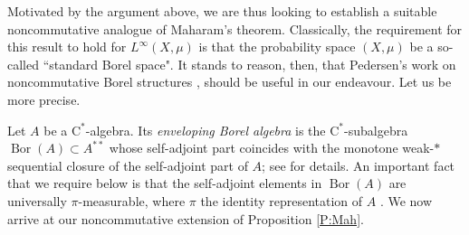 \documentclass[10pt]{amsart}
\newcommand{\rC}{\mathrm{C}}
\newcommand{\Bor}{\operatorname{Bor}}
\theoremstyle{definition}
\begin{document}
Motivated by the argument above, we are thus looking to establish a suitable noncommutative analogue of Maharam's theorem. Classically, the requirement for this result to hold for $L^\infty(X,\mu)$ is that the probability space $(X,\mu)$ be a so-called ``standard Borel space". It stands to reason, then, that Pedersen's work on noncommutative Borel structures \cite{pedersen1974},\cite{pedersen1976} should be useful in our endeavour. Let us be more precise. 

Let $A$ be a $\rC^*$-algebra. Its \emph{enveloping Borel algebra} is the $\rC^*$-subalgebra $\Bor(A)\subset A^{**}$ whose self-adjoint part coincides with the  monotone weak-$*$ sequential closure of the self-adjoint part of $A$; see \cite[Section 4.5]{eilers2018c} for details. An important fact that we require below is that the self-adjoint elements in $\Bor(A)$ are universally $\pi$-measurable, where $\pi$ the identity representation of $A$   \cite[Lemma 4.5.12]{eilers2018c}. We now arrive at our noncommutative extension of Proposition \ref{P:Mah}.
\end{document}
